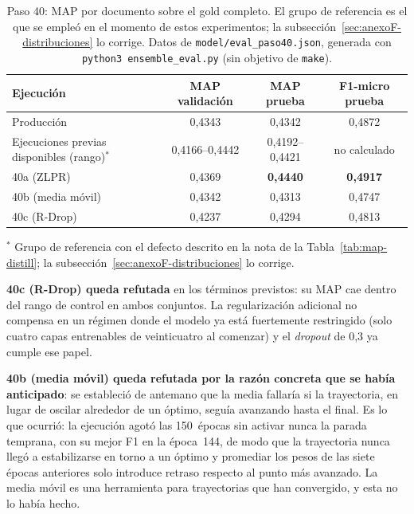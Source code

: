 \begin{table}[h]
\centering
\caption[Paso 40: MAP por documento sobre el gold completo]{Paso 40: MAP por documento sobre el gold completo. El grupo de referencia es el que se empleó en el momento de estos experimentos; la subsección~\ref{sec:anexoF-distribuciones} lo corrige. Datos de \texttt{model/\allowbreak eval\_paso40.json}, generada con \texttt{python3 ensemble\_eval.py} (sin objetivo de \texttt{make}).}
\label{tab:map-paso40}
\begin{tabular}{P{5.2cm}ccc}
\hline
\textbf{Ejecución} & \textbf{MAP validación} & \textbf{MAP prueba} & \textbf{F1-micro prueba} \\
\hline
Producción & 0{,}4343 & 0{,}4342 & 0{,}4872 \\
Ejecuciones previas disponibles (rango)$^{*}$ & 0{,}4166--0{,}4442 & 0{,}4192--0{,}4421 & no calculado \\
\hline
40a (ZLPR) & 0{,}4369 & \textbf{0{,}4440} & \textbf{0{,}4917} \\
40b (media móvil) & 0{,}4342 & 0{,}4313 & 0{,}4747 \\
40c (R-Drop) & 0{,}4237 & 0{,}4294 & 0{,}4813 \\
\hline
\end{tabular}

\vspace{2mm}
{\footnotesize $^{*}$ Grupo de referencia con el defecto descrito en la nota de la Tabla~\ref{tab:map-distill}; la subsección~\ref{sec:anexoF-distribuciones} lo corrige.}
\end{table}

\textbf{40c (R-Drop) queda refutada} en los términos previstos: su MAP cae dentro del rango de control en ambos conjuntos. La regularización adicional no compensa en un régimen donde el modelo ya está fuertemente restringido (solo cuatro capas entrenables de veinticuatro al comenzar) y el \emph{dropout} de 0{,}3 ya cumple ese papel.

\textbf{40b (media móvil) queda refutada por la razón concreta que se había anticipado}: se estableció de antemano que la media fallaría si la trayectoria, en lugar de oscilar alrededor de un óptimo, seguía avanzando hasta el final. Es lo que ocurrió: la ejecución agotó las 150~épocas sin activar nunca la parada temprana, con su mejor F1 en la época~144, de modo que la trayectoria nunca llegó a estabilizarse en torno a un óptimo y promediar los pesos de las siete épocas anteriores solo introduce retraso respecto al punto más avanzado. La media móvil es una herramienta para trayectorias que han convergido, y esta no lo había hecho.

